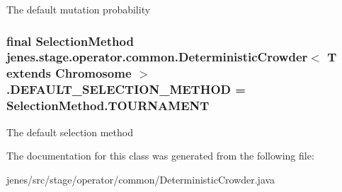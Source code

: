 The default mutation probability \hypertarget{classjenes_1_1stage_1_1operator_1_1common_1_1_deterministic_crowder_3_01_t_01extends_01_chromosome_01_4_a5ca3f3abce0f3163383ed9158b154289}{
\subsubsection[{D\-E\-F\-A\-U\-L\-T\-\_\-\-S\-E\-L\-E\-C\-T\-I\-O\-N\-\_\-\-M\-E\-T\-H\-O\-D}]{\setlength{\rightskip}{0pt plus 5cm}final Selection\-Method jenes.\-stage.\-operator.\-common.\-Deterministic\-Crowder$<$ T extends Chromosome $>$.D\-E\-F\-A\-U\-L\-T\-\_\-\-S\-E\-L\-E\-C\-T\-I\-O\-N\-\_\-\-M\-E\-T\-H\-O\-D = Selection\-Method.\-T\-O\-U\-R\-N\-A\-M\-E\-N\-T\hspace{0.3cm}{\ttfamily [static]}}}\label{classjenes_1_1stage_1_1operator_1_1common_1_1_deterministic_crowder_3_01_t_01extends_01_chromosome_01_4_a5ca3f3abce0f3163383ed9158b154289}
The default selection method 

The documentation for this class was generated from the following file\-:\begin{DoxyCompactItemize}
\item 
jenes/src/stage/operator/common/Deterministic\-Crowder.\-java\end{DoxyCompactItemize}
